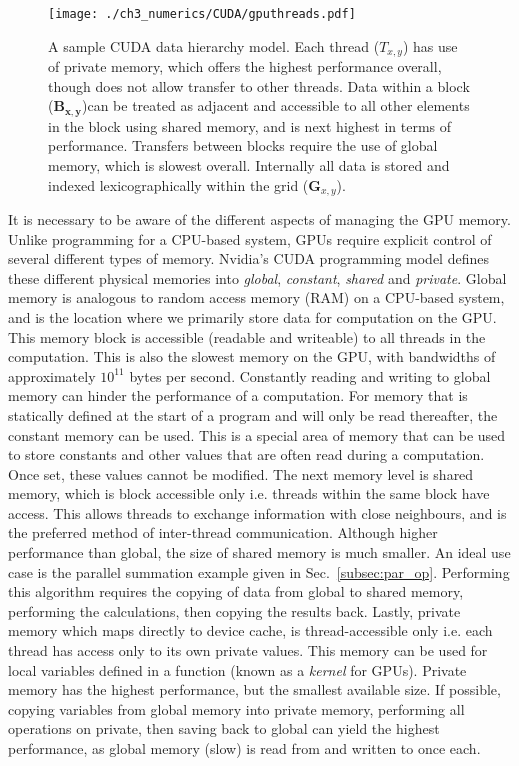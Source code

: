 \begin{figure}[tb]
    \centering
    \texttt{[image: ./ch3\_numerics/CUDA/gputhreads.pdf]}
    \caption{A sample CUDA data hierarchy model. Each thread ($T_{x,y}$) has use of private memory, which offers the highest performance overall, though does not allow transfer to other threads. Data within a block ($\mathbf{B_{x,y}}$)can be treated as adjacent and accessible to all other elements in the block using {shared memory}, and is next highest in terms of performance. Transfers between blocks require the use of {global memory}, which is slowest overall. Internally all data is stored and indexed lexicographically within the grid ($\mathbf{G}_{x,y}$).}
    \label{fig:gpu_threads}
\end{figure}

It is necessary to be aware of the different aspects of managing the GPU memory. Unlike programming for a CPU-based system, GPUs require explicit control of several different types of memory. Nvidia's CUDA programming model defines these different physical memories into \textit{global}, \textit{constant}, \textit{shared} and \textit{private}. Global memory is analogous to random access memory (RAM) on a CPU-based system, and is the location where we primarily store data for computation on the GPU. This memory block is accessible (readable and writeable) to all threads in the computation. This is also the slowest memory on the GPU, with bandwidths of approximately $10^{11}$ bytes per second. Constantly reading and writing to global memory can hinder the performance of a computation. For memory that is statically defined at the start of a program and will only be read thereafter, the constant memory can be used. This is a special area of memory that can be used to store constants and other values that are often read during a computation. Once set, these values cannot be modified. The next memory level is shared memory, which is block accessible only i.e. threads within the same block have access. This allows threads to exchange information with close neighbours, and is the preferred method of inter-thread communication. Although higher performance than global, the size of shared memory is much smaller. An ideal use case is the parallel summation example given in Sec.~\ref{subsec:par_op}. Performing this algorithm requires the copying of data from global to shared memory, performing the calculations, then copying the results back. Lastly, private memory which maps directly to device cache, is thread-accessible only i.e. each thread has access only to its own private values. This memory can be used for local variables defined in a function (known as a \textit{kernel} for GPUs). Private memory has the highest performance, but the smallest available size. If possible, copying variables from global memory into private memory, performing all operations on private, then saving back to global can yield the highest performance, as global memory (slow) is read from and written to once each.

